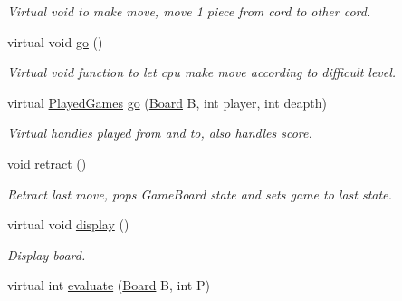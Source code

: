 \begin{DoxyCompactItemize}
\begin{DoxyCompactList}\small\item\em Virtual void to make move, move 1 piece from cord to other cord. \end{DoxyCompactList}\item 
\hypertarget{class_game_ab411d0da584724addd4fdb96fc16b9a4}{virtual void \hyperlink{class_game_ab411d0da584724addd4fdb96fc16b9a4}{go} ()}\label{class_game_ab411d0da584724addd4fdb96fc16b9a4}

\begin{DoxyCompactList}\small\item\em Virtual void function to let cpu make move according to difficult level. \end{DoxyCompactList}\item 
\hypertarget{class_game_acb55f2004706d2ec387750c59681dcdb}{virtual \hyperlink{struct_played_games}{Played\-Games} \hyperlink{class_game_acb55f2004706d2ec387750c59681dcdb}{go} (\hyperlink{class_board}{Board} B, int player, int deapth)}\label{class_game_acb55f2004706d2ec387750c59681dcdb}

\begin{DoxyCompactList}\small\item\em Virtual handles played from and to, also handles score. \end{DoxyCompactList}\item 
\hypertarget{class_game_a9be0655102af94f1a37a7eaec1be36fc}{void \hyperlink{class_game_a9be0655102af94f1a37a7eaec1be36fc}{retract} ()}\label{class_game_a9be0655102af94f1a37a7eaec1be36fc}

\begin{DoxyCompactList}\small\item\em Retract last move, pops Game\-Board state and sets game to last state. \end{DoxyCompactList}\item 
\hypertarget{class_game_a4d0223a84926cbabea95ed7e0392690a}{virtual void \hyperlink{class_game_a4d0223a84926cbabea95ed7e0392690a}{display} ()}\label{class_game_a4d0223a84926cbabea95ed7e0392690a}

\begin{DoxyCompactList}\small\item\em Display board. \end{DoxyCompactList}\item 
\hypertarget{class_game_a57c576172c457a1c128fb46ea557b6c6}{virtual int \hyperlink{class_game_a57c576172c457a1c128fb46ea557b6c6}{evaluate} (\hyperlink{class_board}{Board} B, int P)}\label{class_game_a57c576172c457a1c128fb46ea557b6c6}


\end{DoxyCompactItemize}
